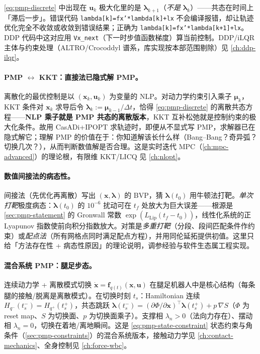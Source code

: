 \begin{pitfall}
\cref{eq:pmp-discrete} 中出现在 $\mathbf u_k$ 极大化里的是 $\boldsymbol\lambda_{k+1}$（\emph{不是} $\boldsymbol\lambda_k$）——共态在时间上「滞后一步」。错误代码 \texttt{lambda[k]=fx'*lambda[k]+lx} 不会编译报错，却让轨迹优化完全不收敛或收敛到错误结果；正确为 \texttt{lambda[k]=fx'*lambda[k+1]+lx}。DDP 代码中这对应用 \texttt{Vx\_next}（下一时步值函数梯度）算当前控制。DDP/iLQR 主体与约束处理（ALTRO/Crocoddyl 谱系，库实现按本部范围剔除）见 \cref{ch:ddp-ilqr}。
\end{pitfall}

\paragraph{PMP $\leftrightarrow$ KKT：直接法已隐式解 PMP。}
离散化的最优控制是以 $(\mathbf x_k,\mathbf u_k)$ 为变量的 NLP。对动力学约束引入乘子 $\boldsymbol\mu_k$，KKT 条件对 $\mathbf x_k$ 求导后令 $\boldsymbol\lambda_k:=\boldsymbol\mu_{k-1}/\Delta t$，恰得 \cref{eq:pmp-discrete} 的离散共态方程——\textbf{NLP 乘子就是 PMP 共态的离散版本}，KKT 互补松弛就是控制约束的极大化条件。故用 CasADi+IPOPT 求轨迹时，即便从不显式写 PMP，求解器已在隐式解它；理解 PMP 的价值在于：你知道解该长什么样（Bang--Bang？奇异弧？切换几次？），从而判断数值解是否合理。这是实时迭代 MPC（\cref{ch:mpc-advanced}）的理论根，有限维 KKT/LICQ 见 \cref{ch:nlopt}。

\paragraph{数值间接法的病态性。}
间接法（先优化再离散）写出 $(\mathbf x,\boldsymbol\lambda)$ 的 BVP，猜 $\boldsymbol\lambda(t_0)$ 用牛顿法打靶。\emph{单次打靶}极度病态：$\boldsymbol\lambda(t_0)$ 的 $10^{-6}$ 扰动可在 $t_f$ 处放大为巨大误差——根源是 \cref{sec:pmp-statement} 的 Gronwall 常数 $\exp(L_{\mathrm{Lip}}(t_f-t_0))$，线性化系统的正 Lyapunov 指数使前向积分指数放大。对策是\emph{多重打靶}（分段、段间匹配条件作约束）或\emph{配点法}（所有网格点同时满足配点方程），并用同伦延拓提供初值。这里只给「方法存在性 + 病态性原因」的理论说明，调参经验与软件生态属工程实现。

\paragraph{混合系统 PMP：腿足步态。}
连续动力学 + 离散模式切换 $\dot{\mathbf x}=\mathbf f_{q(t)}(\mathbf x,\mathbf u)$ 在腿足机器人中是核心结构（每条腿的接触/脱离是离散模式）。在切换时刻 $t_s$：Hamiltonian 连续 $H_{q^-}(t_s^-)=H_{q^+}(t_s^+)$，共态跳跃 $\boldsymbol\lambda(t_s^-)=(\partial\Phi/\partial\mathbf x)^\top\boldsymbol\lambda(t_s^+)+p\,\nabla S$（$\Phi$ 为 reset map、$S$ 为切换面、$p$ 为切换面乘子）\cite{sussmann1999maximum,shaikh2007hybrid}。支撑相 $\lambda_n>0$（法向力存在）、摆动相 $\lambda_n=0$，切换在着地/离地瞬间。这是 \cref{eq:pmp-state-constraint} 状态约束与角条件（\cref{sec:pmp-constraints}）的混合系统版本，接触动力学见 \cref{ch:contact-mechanics}、全身控制见 \cref{ch:force-wbc}。

